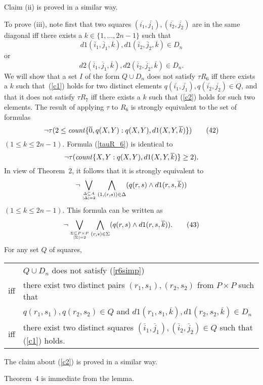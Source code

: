 \documentclass{tlp_mod}
\def\o{\overline}
\def\beq{\begin{equation}}
\def\eeq#1{\label{#1}\end{equation}}
\def\i#1{\hbox{\it #1\/}}
\begin{document}
\begin{proof*}
Claim (ii) is proved in a similar way.  

To prove (iii), note first that two squares 
$(\o{i_1}, \o{j_1}), (\o{i_2}, \o{j_2})$ are in the same diagonal iff
there exists a $k \in \{1, \dots, 2n-1\}$ such that 
\[
d1(\o i_1, \o j_1, \o k), d1(\o i_2, \o j_2, \o k) \in D_n
\tag{40}
\label{c1} 
\]
or
\[
d2(\o i_1, \o j_1, \o k), d2(\o i_2, \o j_2, \o k) \in D_n. 
\tag{41}
\label{c2}
\]
We will show that a set $I$ of the form $Q \cup D_n$ does not satisfy 
$\tau R_6$ iff 
there exists a $k$ such that~(\ref{c1}) holds for two distinct elements 
$q(\o{i_1}, \o{j_1}), q(\o{i_2}, \o{j_2}) \in Q$, and that it does not  
satisfy 
$\tau R_7$ iff there exists a $k$ such that (\ref{c2}) holds for such two
elements.  The result of applying $\tau$ to $R_6$ is strongly 
equivalent to the set of formulas 
\[
  \neg \tau(2 \leq \i{count}\{\o 0, q(X,Y) : q(X,Y), d1(X,Y,\o k)\})
\tag{42}
\label{tauR_6}
\]
$(1 \leq k \leq 2n-1)$. Formula (\ref{tauR_6}) is identical to 
$$
\neg \tau ( \i{count}\{X,Y : q(X,Y), d1(X,Y,\o k)\} \geq 2 ). 
$$ 
In view of Theorem~2, it follows that it is strongly equivalent
to 
$$ 
\neg \bigvee_{\Delta \subseteq A \atop \lvert \Delta
 \rvert = 2} \bigwedge_{(1, (r,s)) \in \Delta} (q(r, s) \land d1(r, s,  \o k))
$$
$(1 \leq k \leq 2n-1)$. This formula can be written as  
\[
 \neg \bigvee_{\Sigma \subseteq P \times P \atop \lvert \Sigma 
 \rvert = 2} \bigwedge_{(r,s) \in \Sigma} (q(r, s) \land d1(r, s,  \o k)).
\tag{43}
\label{r6simp}\]
For any set $Q$ of squares, 
\begin{center}
\begin{tabular}{l  l}
    & $Q \cup D_n$ does not satisfy (\ref{r6simp}) \\
iff & there exist two distinct pairs $(r_1, s_1), (r_2, s_2)$ from 
    $P \times P$ such that\\
    & $q(r_1,s_1),q(r_2, s_2) \in Q$ and $d1(r_1,s_1,\o k), 
    d1(r_2, s_2, \o k) \in D_n$\\
iff & there exist two distinct squares $(\o i_1, \o j_1), (\o i_2, \o j_2) \in 
    Q$ such that (\ref{c1}) holds.
\end{tabular}
\end{center}

The claim about (\ref{c2}) is proved in a similar way. 
\end{proof*}

Theorem~4 is immediate from the lemma. 

% 
% 
\end{document}
